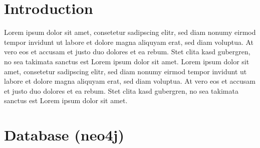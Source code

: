 \documentclass[11pt,fleqn,openany]{book} %
\begin{document}


\chapter{Introduction}

Lorem ipsum dolor sit amet, consetetur sadipscing elitr, sed diam nonumy eirmod tempor invidunt ut labore et dolore magna aliquyam erat, sed diam voluptua. At vero eos et accusam et justo duo dolores et ea rebum. Stet clita kasd gubergren, no sea takimata sanctus est Lorem ipsum dolor sit amet. Lorem ipsum dolor sit amet, consetetur sadipscing elitr, sed diam nonumy eirmod tempor invidunt ut labore et dolore magna aliquyam erat, sed diam voluptua. At vero eos et accusam et justo duo dolores et ea rebum. Stet clita kasd gubergren, no sea takimata sanctus est Lorem ipsum dolor sit amet.




\chapter{Database (neo4j)}
\end{document}
